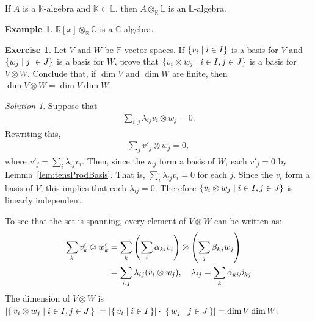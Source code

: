 \documentclass{article}
\theoremstyle{definition}
\newtheorem*{Example*}{Example}
\newtheorem{Exercise}{Exercise}
\theoremstyle{remark}
\newtheorem*{Solution*}{Solution}
\theoremstyle{underline}
\theoremstyle{underline}
\begin{document}
	If $A$ is a $\mathbb K$-algebra and $\mathbb K \subset \mathbb L$, then $A \otimes_{\mathbb K} \mathbb L$ is an $\mathbb L$-algebra.

	\begin{Example*}
		$\mathbb R[x] \otimes_{\mathbb R} \mathbb C$ is a $\mathbb C$-algebra.
	\end{Example*}

	\begin{Exercise}
		Let $V$ and $W$ be $\mathbb{F}$-vector spaces. If $\qty{v_i \mid i \in I}$ is a basis for $V$ and $\qty{w_j \mid j \
		\in J}$ is a basis for $W$, prove that $\qty{v_i \otimes w_j \mid i \in I, j \in J}$ is a basis for $V \otimes W$. Conclude that, if $\dim V$ and $\dim W$ are finite, then $\dim V \otimes W = \dim V \dim W$.
	\end{Exercise}
	\begin{Solution*}
		Suppose that
		\begin{gather*}
			\sum_{i,j} \lambda_{ij} v_i \otimes w_j = 0.
		\end{gather*}
		Rewriting this,
		\begin{gather*}
			\sum_j v'_j \otimes w_j = 0,
		\end{gather*}
		where $v'_j = \sum_i \lambda_{ij} v_i$. Then, since the $w_j$ form a basis of $W$, each $v'_j = 0$ by Lemma~\ref{lem:tensProdBasis}. That is, $\sum\limits_i \lambda_{ij} v_i = 0$ for each $j$. Since the $v_i$ form a basis of $V$, this implies that each $\lambda_{ij} = 0$. Therefore $\qty{v_i \otimes w_j \mid i \in I, j \in J}$ is linearly independent.
		
		To see that the set is spanning, every element of $V \otimes W$ can be written as:
		\begin{align*}
			\sum_{k} v'_k \otimes w'_k & = \sum_k \pqty{\sum_i \alpha_{ki} v_i} \otimes \pqty{\sum_j \beta_{kj} w_j} \\
				& = \sum_{i,j} \lambda_{ij} \pqty{v_i \otimes w_j}, \quad \lambda_{ij} = \sum_k \alpha_{ki} \beta_{kj}
		\end{align*}
		The dimension of $V \otimes W$ is $\abs{\qty{\, v_i \otimes w_j \mid i \in I, j \in J \,}} = \abs{\qty{\, v_i \mid i \in I \,} } \cdot \abs{\qty{\, w_j \mid j \in J \,}} = \dim V \dim W$.
	\end{Solution*}
\end{document}
